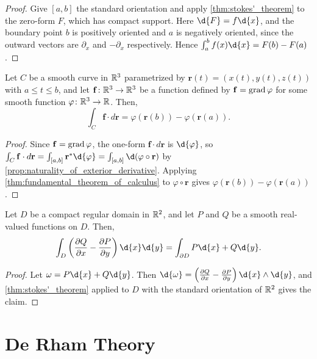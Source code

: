 \documentclass[a4paper,12pt]{article}
\begin{document}
\begin{proof}
    Give $[a, b]$ the standard orientation and apply \cref{thm:stokes'_theorem} to the zero-form $F$, which has compact support.
    Here $\d{F} = f \d{x}$, and the boundary point $b$ is positively oriented and $a$ is negatively oriented, since the outward vectors are $\partial_x$ and $-\partial_x$ respectively.
    Hence $\int_a^b f(x) \d{x} = F(b) - F(a)$.
\end{proof}
\begin{theorem}\label{thm:gradient_theorem}
    Let $C$ be a smooth curve in $\mathbb{R}^3$ parametrized by $\mathbf{r}(t) = (x(t), y(t), z(t))$ with $a \leq t \leq b$, and let $\mathbf{f} \colon \mathbb{R}^3 \to \mathbb{R}^3$ be a function defined by $\mathbf{f} = \operatorname{grad} \varphi$ for some smooth function $\varphi \colon \mathbb{R}^3 \to \mathbb{R}$.
    Then,
    \begin{equation}
        \int_C \mathbf{f} \cdot d\mathbf{r} = \varphi(\mathbf{r}(b)) - \varphi(\mathbf{r}(a)).
    \end{equation}
\end{theorem}
\begin{proof}
    Since $\mathbf{f} = \operatorname{grad} \varphi$, the one-form $\mathbf{f} \cdot d\mathbf{r}$ is $\d{\varphi}$, so $\int_C \mathbf{f} \cdot d\mathbf{r} = \int_{[a, b]} \mathbf{r}^*\d{\varphi} = \int_{[a, b]} \d(\varphi \circ \mathbf{r})$ by \cref{prop:naturality_of_exterior_derivative}.
    Applying \cref{thm:fundamental_theorem_of_calculus} to $\varphi \circ \mathbf{r}$ gives $\varphi(\mathbf{r}(b)) - \varphi(\mathbf{r}(a))$.
\end{proof}
\begin{theorem}\label{thm:green's_theorem}
    Let $D$ be a compact regular domain in $\mathbb{R}^2$, and let $P$ and $Q$ be a smooth real-valued functions on $D$.
    Then,
    \begin{equation}
        \int_D \left(\frac{\partial Q}{\partial x} - \frac{\partial P}{\partial y}\right) \d{x}\d{y} = \int_{\partial D} P \d{x} + Q \d{y}.
    \end{equation}
\end{theorem}
\begin{proof}
    Let $\omega = P \d{x} + Q \d{y}$.
    Then $\d{\omega} = \left(\frac{\partial Q}{\partial x} - \frac{\partial P}{\partial y}\right) \d{x} \wedge \d{y}$, and \cref{thm:stokes'_theorem} applied to $D$ with the standard orientation of $\mathbb{R}^2$ gives the claim.
\end{proof}

\section{De Rham Theory}\label{sec:de_rham_theory}
\end{document}
